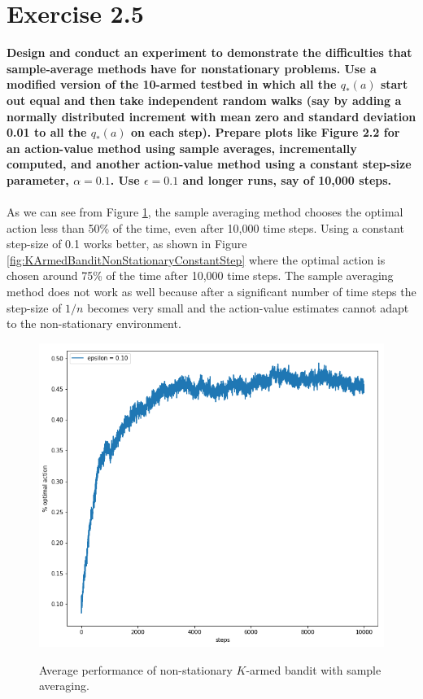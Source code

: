 \documentclass[a4paper,11pt]{article}
\numberwithin{equation}{section}
\theoremstyle{remark}
\begin{document}
\section{Exercise 2.5}

\textbf{Design and conduct an experiment to demonstrate the difficulties that sample-average methods have for nonstationary problems. Use a modified version of the 10-armed testbed in which all the $q_*(a)$ start out equal and then take independent random walks (say by adding a normally distributed increment with mean zero and standard deviation 0.01 to all the $q_*(a)$ on each step). Prepare plots like Figure 2.2 for an action-value method using sample averages, incrementally computed, and another action-value method using a constant step-size parameter, $\alpha = 0.1$. Use $\epsilon = 0.1$ and longer runs, say of 10,000 steps.}
\\ \\ 
As we can see from Figure \ref{fig:KArmedBanditNonStationarySampleAveraging}, the sample averaging method chooses the optimal action less than 50\% of the time, even after 10,000 time steps. Using a constant step-size of 0.1 works better, as shown in Figure \ref{fig:KArmedBanditNonStationaryConstantStep} where the optimal action is chosen around 75\% of the time after 10,000 time steps.  The sample averaging method does not work as well because after a significant number of time steps the step-size of $1/n$ becomes very small and the action-value estimates cannot adapt to the non-stationary environment.


\begin{figure}
	\centering
	\caption{Average performance of non-stationary $K$-armed bandit with sample averaging.}
	\includegraphics[scale=0.5]{ex2_5_1}
	\label{fig:KArmedBanditNonStationarySampleAveraging}
\end{figure}
\end{document}
